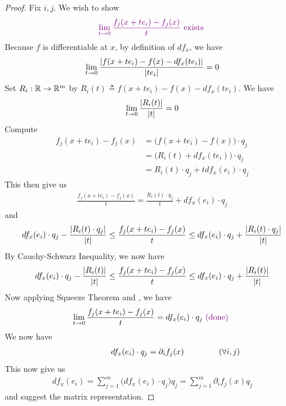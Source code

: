 \documentclass{report}
\begin{document}
\begin{proof}
Fix $i,j$. We wish to show 
 \begin{align*}
\textcolor{violet}{\lim_{t\to 0} \frac{f_j(x+te_i)-f_j(x)}{t}\text{ exists }}
\end{align*}
Because $f$ is differentiable at $x$, by definition of $df_x$, we have
\begin{align*}
\lim_{t\to 0} \frac{\left|f(x+te_i)-f(x)-df_x(te_i)\right|}{\left|te_i\right|}=0
\end{align*}
Set $R_i:\mathbb{R}\rightarrow \mathbb{R}^m$ by $R_i(t)\triangleq f(x+te_i)-f(x)-df_x(te_i)$. We have 
\begin{align}
\label{Dij1}
  \lim_{t\to 0}\frac{\left|R_i(t)\right|}{\left|t\right|}=0
\end{align}
Compute
\begin{align*}
f_j(x+te_i)-f_j(x)&=\big(f(x+te_i)-f(x) \big)\cdot q_j\\
&=\big(R_i(t)+df_x(te_i) \big) \cdot q_j\\
&= R_i(t)\cdot q_j+ tdf_x(e_i)\cdot q_j
\end{align*}
This then give us 
\begin{align*}
\frac{f_j(x+te_i)-f_j(x)}{t}=\frac{R_i(t)\cdot q_j}{t}+ df_x(e_i)\cdot q_j
\end{align*}
and 
\begin{align*}
  df_x(e_i)\cdot q_j - \frac{\left|R_i(t)\cdot q_j\right|}{\left|t\right|} \leq \frac{f_j(x+te_i)-f_j(x)}{t}\leq df_x(e_i)\cdot q_j + \frac{\left|R_i(t)\cdot q_j\right|}{\left|t\right|}
\end{align*}
By Cauchy-Schwarz Inequality, we now have 
\begin{align*}
  df_x(e_i)\cdot q_j - \frac{\left|R_i(t)\right|}{\left|t\right|} \leq \frac{f_j(x+te_i)-f_j(x)}{t}\leq df_x(e_i)\cdot q_j + \frac{\left|R_i(t)\right|}{\left|t\right|}
\end{align*}
Now applying Squeeze Theorem and , we have  
\begin{align*}
\lim_{t\to 0} \frac{f_j(x+te_i)-f_j(x)}{t}=df_x(e_i)\cdot q_j \textcolor{violet}{\text{ (done) }}
\end{align*}
We now have 
\begin{align*}
\hspace{2cm}df_x(e_i)\cdot q_j=\partial _if_j(x)\hspace{1.5cm}(\forall i,j)
\end{align*}
This now give us 
\begin{align*}
df_x(e_i)=\sum_{j=1}^m \Big(df_x(e_i)\cdot q_j \Big)q_j=\sum_{j=1}^m \partial_if_j(x)q_j
\end{align*}
and suggest the matrix representation. 
\end{proof}
\end{document}
